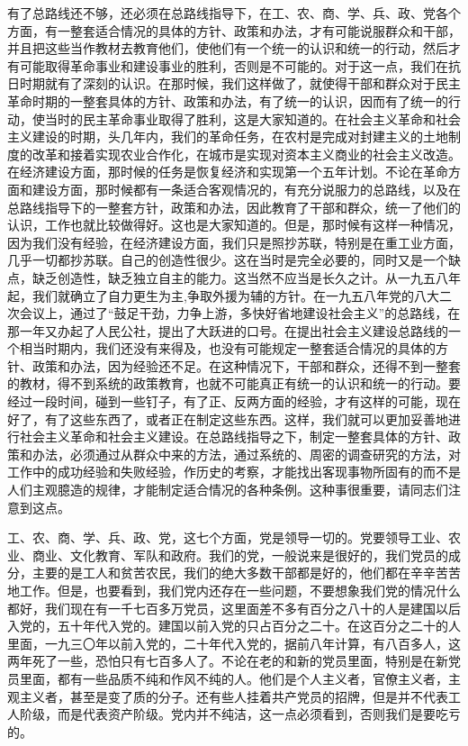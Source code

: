 有了总路线还不够，还必须在总路线指导下，在工、农、商、学、兵、政、党各个方面，有一整套适合情况的具体的方针、政策和办法，才有可能说服群众和干部，并且把这些当作教材去教育他们，使他们有一个统一的认识和统一的行动，然后才有可能取得革命事业和建设事业的胜利，否则是不可能的。对于这一点，我们在抗日时期就有了深刻的认识。在那时候，我们这样做了，就使得干部和群众对于民主革命时期的一整套具体的方针、政策和办法，有了统一的认识，因而有了统一的行动，使当时的民主革命事业取得了胜利，这是大家知道的。在社会主义革命和社会主义建设的时期，头几年内，我们的革命任务，在农村是完成对封建主义的土地制度的改革和接着实现农业合作化，在城市是实现对资本主义商业的社会主义改造。在经济建设方面，那时候的任务是恢复经济和实现第一个五年计划。不论在革命方面和建设方面，那时候都有一条适合客观情况的，有充分说服力的总路线，以及在总路线指导下的一整套方针，政策和办法，因此教育了干部和群众，统一了他们的认识，工作也就比较做得好。这也是大家知道的。但是，那时候有这样一种情况，因为我们没有经验，在经济建设方面，我们只是照抄苏联，特别是在重工业方面，几乎一切都抄苏联。自己的创造性很少。这在当时是完全必要的，同时又是一个缺点，缺乏创造性，缺乏独立自主的能力。这当然不应当是长久之计。从一九五八年起，我们就确立了自力更生为主,争取外援为辅的方针。在一九五八年党的八大二次会议上，通过了“鼓足干劲，力争上游，多快好省地建设社会主义”的总路线，在那一年又办起了人民公社，提出了大跃进的口号。在提出社会主义建设总路线的一个相当时期内，我们还没有来得及，也没有可能规定一整套适合情况的具体的方针、政策和办法，因为经验还不足。在这种情况下，干部和群众，还得不到一整套的教材，得不到系统的政策教育，也就不可能真正有统一的认识和统一的行动。要经过一段时间，碰到一些钉子，有了正、反两方面的经验，才有这样的可能，现在好了，有了这些东西了，或者正在制定这些东西。这样，我们就可以更加妥善地进行社会主义革命和社会主义建设。在总路线指导之下，制定一整套具体的方针、政策和办法，必须通过从群众中来的方法，通过系统的、周密的调查研究的方法，对工作中的成功经验和失败经验，作历史的考察，才能找出客现事物所固有的而不是人们主观臆造的规律，才能制定适合情况的各种条例。这种事很重要，请同志们注意到这点。

工、农、商、学、兵、政、党，这七个方面，党是领导一切的。党要领导工业、农业、商业、文化教育、军队和政府。我们的党，一般说来是很好的，我们党员的成分，主要的是工人和贫苦农民，我们的绝大多数干部都是好的，他们都在辛辛苦苦地工作。但是，也要看到，我们党内还存在一些问题，不要想象我们党的情况什么都好，我们现在有一千七百多万党员，这里面差不多有百分之八十的人是建国以后入党的，五十年代入党的。建国以前入党的只占百分之二十。在这百分之二十的人里面，一九三〇年以前入党的，二十年代入党的，据前八年计算，有八百多人，这两年死了一些，恐怕只有七百多人了。不论在老的和新的党员里面，特别是在新党员里面，都有一些品质不纯和作风不纯的人。他们是个人主义者，官僚主义者，主观主义者，甚至是变了质的分子。还有些人挂着共产党员的招牌，但是并不代表工人阶级，而是代表资产阶级。党内并不纯洁，这一点必须看到，否则我们是要吃亏的。

